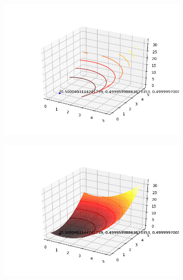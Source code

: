 \documentclass[a4paper, 12pt]{article}
\begin{document}
\begin{figure}[H]
\centering
\begin{subfigure}{0.3\textwidth}
  \centering
  \includegraphics[width=\linewidth]{1/A/RP1/contorno.png}
\end{subfigure}%
\begin{subfigure}{0.3\textwidth}
  \centering
  \includegraphics[width=\linewidth]{1/A/RP1/superficie.png}
\end{subfigure}
\begin{subfigure}{0.3\textwidth}
  \centering

\end{subfigure}
\end{figure}
\end{document}
